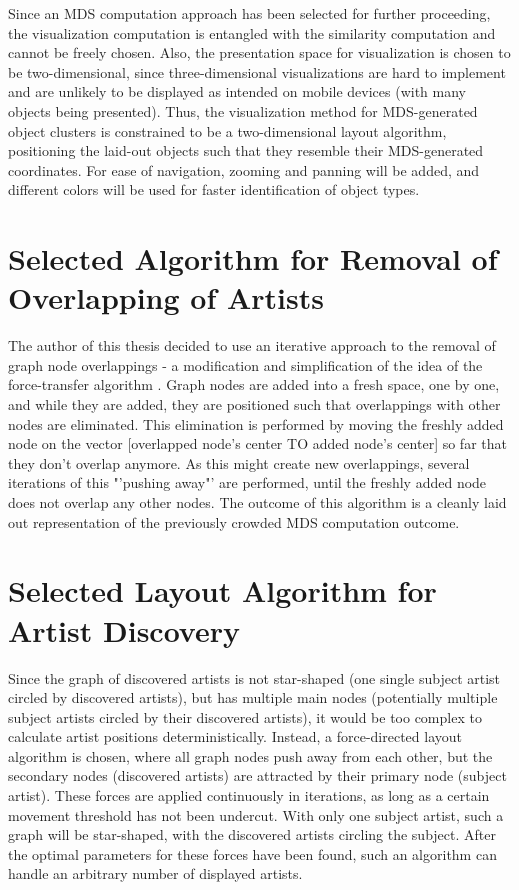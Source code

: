 Since an MDS computation approach has been selected for further proceeding, the visualization computation is entangled with the similarity computation and cannot be freely chosen. Also, the presentation space for visualization is chosen to be two-dimensional, since three-dimensional visualizations are hard to implement and are unlikely to be displayed as intended on mobile devices (with many objects being presented). Thus, the visualization method for MDS-generated object clusters is constrained to be a two-dimensional layout algorithm, positioning the laid-out objects such that they resemble their MDS-generated coordinates. For ease of navigation, zooming and panning will be added, and different colors will be used for faster identification of object types.

\section{Selected Algorithm for Removal of Overlapping of Artists}

The author of this thesis decided to use an iterative approach to the removal of graph node overlappings - a modification and simplification of the idea of the force-transfer algorithm \cite{Huang03force-transfer:a}. Graph nodes are added into a fresh space, one by one, and while they are added, they are positioned such that overlappings with other nodes are eliminated. This elimination is performed by moving the freshly added node on the vector [overlapped node's center TO added node's center] so far that they don't overlap anymore. As this might create new overlappings, several iterations of this "'pushing away"' are performed, until the freshly added node does not overlap any other nodes. The outcome of this algorithm is a cleanly laid out representation of the previously crowded MDS computation outcome.

\section{Selected Layout Algorithm for Artist Discovery}

Since the graph of discovered artists is not star-shaped (one single subject artist circled by discovered artists), but has multiple main nodes (potentially multiple subject artists circled by their discovered artists), it would be too complex to calculate artist positions deterministically. Instead, a force-directed layout algorithm is chosen, where all graph nodes push away from each other, but the secondary nodes (discovered artists) are attracted by their primary node (subject artist). These forces are applied continuously in iterations, as long as a certain movement threshold has not been undercut. With only one subject artist, such a graph will be star-shaped, with the discovered artists circling the subject. After the optimal parameters for these forces have been found, such an algorithm can handle an arbitrary number of displayed artists.

